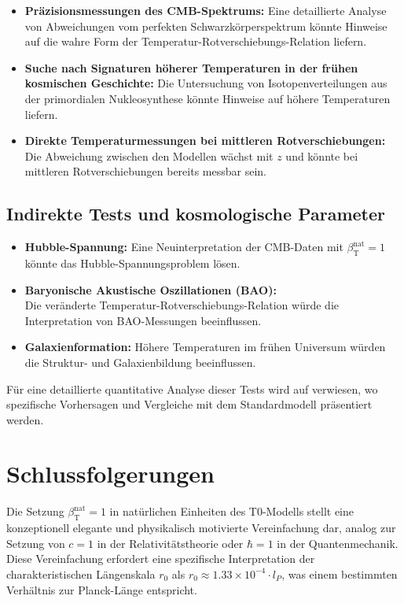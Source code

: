 \documentclass[12pt,a4paper]{article}
\newcommand{\betaT}{\beta_{\text{T}}}
\begin{document}
	\begin{itemize}
		\item \textbf{Präzisionsmessungen des CMB-Spektrums:} Eine detaillierte Analyse von Abweichungen vom perfekten Schwarzkörperspektrum könnte Hinweise auf die wahre Form der Temperatur-Rotverschiebungs-Relation liefern.
		\item \textbf{Suche nach Signaturen höherer Temperaturen in der frühen kosmischen Geschichte:} Die Untersuchung von Isotopenverteilungen aus der primordialen Nukleosynthese könnte Hinweise auf höhere Temperaturen liefern.
		\item \textbf{Direkte Temperaturmessungen bei mittleren Rotverschiebungen:} Die Abweichung zwischen den Modellen wächst mit \(z\) und könnte bei mittleren Rotverschiebungen bereits messbar sein.
	\end{itemize}
	
	\subsection{Indirekte Tests und kosmologische Parameter}
	
	\begin{itemize}
		\item \textbf{Hubble-Spannung:} Eine Neuinterpretation der CMB-Daten mit \(\betaT^{\text{nat}} = 1\) könnte das Hubble-Spannungsproblem lösen.
		\item \textbf{Baryonische Akustische Oszillationen (BAO):} \\Die veränderte Temperatur-Rotverschiebungs-Relation würde die Interpretation von BAO-Messungen beeinflussen.
		\item \textbf{Galaxienformation:} Höhere Temperaturen im frühen Universum würden die Struktur- und Galaxienbildung beeinflussen.
	\end{itemize}
	
	Für eine detaillierte quantitative Analyse dieser Tests wird auf \cite{pascher_alphabeta_2025} verwiesen, wo spezifische Vorhersagen und Vergleiche mit dem Standardmodell präsentiert werden.
	
	\section{Schlussfolgerungen}
	
	Die Setzung \(\betaT^{\text{nat}} = 1\) in natürlichen Einheiten des T0-Modells stellt eine konzeptionell elegante und physikalisch motivierte Vereinfachung dar, analog zur Setzung von \(c = 1\) in der Relativitätstheorie oder \(\hbar = 1\) in der Quantenmechanik. Diese Vereinfachung erfordert eine spezifische Interpretation der charakteristischen Längenskala \(r_0\) als \(r_0 \approx 1.33 \times 10^{-4} \cdot l_P\), was einem bestimmten Verhältnis zur Planck-Länge entspricht.
	
\end{document}
